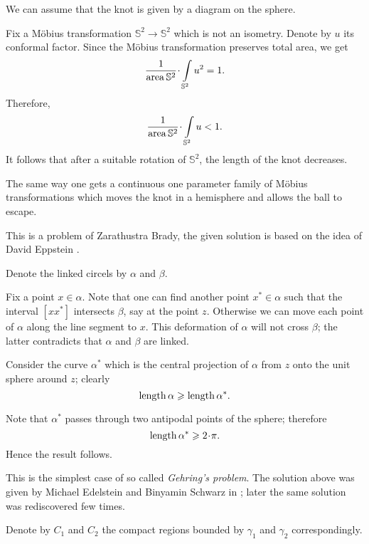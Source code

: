 We can assume that the knot is given by a diagram on the sphere.

Fix a M\"obius transformation $\mathbb{S}^2\to\mathbb{S}^2$ which is not an isometry.
Denote by $u$ its conformal factor. 
Since the M\"obius transformation preserves total area, 
we get 
$$\frac1{\area \mathbb{S}^2}\cdot\int\limits_{\mathbb{S}^2} u^2=1.$$ 
Therefore, 
$$\frac1{\area \mathbb{S}^2}\cdot\int\limits_{\mathbb{S}^2} u<1.$$ 
It follows that after a suitable rotation of $\mathbb{S}^2$, 
the length of the knot decreases.

The same way one gets 
a continuous one parameter family of M\"obius transformations which moves the knot in a hemisphere 
and allows the ball to escape. \qeds


This is a problem of Zarathustra Brady, 
the given solution is based on the idea of David Eppstein \cite[see][]{zeb}.



Denote the linked circels by $\alpha$ and $\beta$.

Fix a point $x\in\alpha$. 
Note that one can find another point $x^{*}\in\alpha$ such that the interval 
$[xx^{*}]$ intersects $\beta$, say at the point $z$. 
Otherwise we can move each point of $\alpha$ along the line segment to $x$.
This deformation of $\alpha$ will not cross $\beta$;
the latter contradicts that $\alpha$ and $\beta$ are linked. 


Consider the curve $\alpha^{*}$ which is the central projection of $\alpha$ 
from $z$ onto the unit sphere around $z$;
clearly
$$\operatorname{\rm length} \alpha\geqslant \operatorname{\rm length}\alpha^{*}.$$

Note that $\alpha^{*}$ passes through two antipodal points of the sphere;
therefore 
$$\length \alpha^{*}\ge 2\cdot\pi.$$
Hence the result follows.\qeds


This is the simplest case of so called \emph{Gehring's problem}. 
The solution above was given by Michael Edelstein and Binyamin Schwarz in \cite{edelstein-schwatz};
later the same solution was rediscovered few times.





Denote by $C_1$ and $C_2$ the compact regions bounded by $\gamma_1$ and $\gamma_2$ correspondingly.

